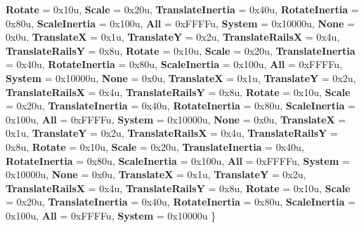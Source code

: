 \begin{DoxyCompactItemize}
{\bfseries Rotate} = 0x10u, 
{\bfseries Scale} = 0x20u, 
{\bfseries Translate\+Inertia} = 0x40u, 
\newline
{\bfseries Rotate\+Inertia} = 0x80u, 
{\bfseries Scale\+Inertia} = 0x100u, 
{\bfseries All} = 0x\+F\+F\+F\+Fu, 
{\bfseries System} = 0x10000u, 
\newline
{\bfseries None} = 0x0u, 
{\bfseries TranslateX} = 0x1u, 
{\bfseries TranslateY} = 0x2u, 
{\bfseries Translate\+RailsX} = 0x4u, 
\newline
{\bfseries Translate\+RailsY} = 0x8u, 
{\bfseries Rotate} = 0x10u, 
{\bfseries Scale} = 0x20u, 
{\bfseries Translate\+Inertia} = 0x40u, 
\newline
{\bfseries Rotate\+Inertia} = 0x80u, 
{\bfseries Scale\+Inertia} = 0x100u, 
{\bfseries All} = 0x\+F\+F\+F\+Fu, 
{\bfseries System} = 0x10000u, 
\newline
{\bfseries None} = 0x0u, 
{\bfseries TranslateX} = 0x1u, 
{\bfseries TranslateY} = 0x2u, 
{\bfseries Translate\+RailsX} = 0x4u, 
\newline
{\bfseries Translate\+RailsY} = 0x8u, 
{\bfseries Rotate} = 0x10u, 
{\bfseries Scale} = 0x20u, 
{\bfseries Translate\+Inertia} = 0x40u, 
\newline
{\bfseries Rotate\+Inertia} = 0x80u, 
{\bfseries Scale\+Inertia} = 0x100u, 
{\bfseries All} = 0x\+F\+F\+F\+Fu, 
{\bfseries System} = 0x10000u, 
\newline
{\bfseries None} = 0x0u, 
{\bfseries TranslateX} = 0x1u, 
{\bfseries TranslateY} = 0x2u, 
{\bfseries Translate\+RailsX} = 0x4u, 
\newline
{\bfseries Translate\+RailsY} = 0x8u, 
{\bfseries Rotate} = 0x10u, 
{\bfseries Scale} = 0x20u, 
{\bfseries Translate\+Inertia} = 0x40u, 
\newline
{\bfseries Rotate\+Inertia} = 0x80u, 
{\bfseries Scale\+Inertia} = 0x100u, 
{\bfseries All} = 0x\+F\+F\+F\+Fu, 
{\bfseries System} = 0x10000u, 
\newline
{\bfseries None} = 0x0u, 
{\bfseries TranslateX} = 0x1u, 
{\bfseries TranslateY} = 0x2u, 
{\bfseries Translate\+RailsX} = 0x4u, 
\newline
{\bfseries Translate\+RailsY} = 0x8u, 
{\bfseries Rotate} = 0x10u, 
{\bfseries Scale} = 0x20u, 
{\bfseries Translate\+Inertia} = 0x40u, 
\newline
{\bfseries Rotate\+Inertia} = 0x80u, 
{\bfseries Scale\+Inertia} = 0x100u, 
{\bfseries All} = 0x\+F\+F\+F\+Fu, 
{\bfseries System} = 0x10000u
 \}
\item 
\mbox{\label{namespace_windows_1_1_u_i_1_1_xaml_1_1_input_a79a24b7b4f6dcfda601ea71a4020fd05}} 

\end{DoxyCompactItemize}
